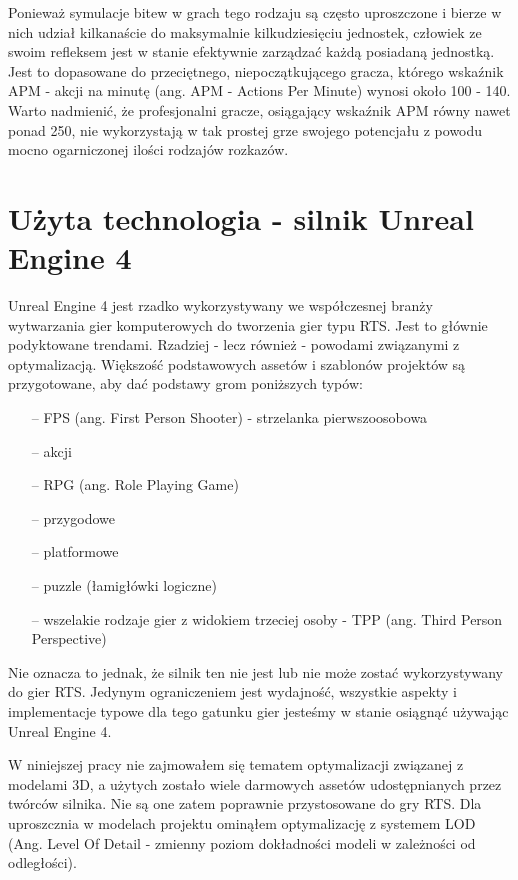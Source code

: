 \documentclass[12pt]{report}
\begin{document}
Ponieważ symulacje bitew w grach tego rodzaju są często uproszczone i bierze w nich udział kilkanaście do maksymalnie kilkudziesięciu jednostek, człowiek ze swoim refleksem jest w stanie efektywnie zarządzać każdą posiadaną jednostką. Jest to dopasowane do przeciętnego, niepoczątkującego gracza, którego wskaźnik APM - akcji na minutę (ang. APM - Actions Per Minute) wynosi około 100 - 140. Warto nadmienić, że profesjonalni gracze, osiągający wskaźnik APM równy nawet ponad 250, nie wykorzystają w tak prostej grze swojego potencjału z powodu mocno ogarniczonej ilości rodzajów rozkazów.




\chapter{Użyta technologia - silnik Unreal Engine 4}

Unreal Engine 4 jest rzadko wykorzystywany we współczesnej branży wytwarzania gier komputerowych do tworzenia gier typu RTS. Jest to głównie podyktowane trendami. Rzadziej - lecz również - powodami związanymi z optymalizacją. Większość podstawowych assetów i szablonów projektów są przygotowane, aby dać podstawy grom poniższych typów:
\begin{itemize}
\item[--] FPS (ang. First Person Shooter) - strzelanka pierwszoosobowa
\item[--] akcji
\item[--] RPG (ang. Role Playing Game)
\item[--] przygodowe
\item[--] platformowe
\item[--] puzzle (łamigłówki logiczne)
\item[--] wszelakie rodzaje gier z widokiem trzeciej osoby - TPP (ang. Third Person Perspective)  
\end{itemize}

Nie oznacza to jednak, że silnik ten nie jest lub nie może zostać wykorzystywany do gier RTS. Jedynym ograniczeniem jest wydajność, wszystkie aspekty i implementacje typowe dla tego gatunku gier jesteśmy w stanie osiągnąć używając Unreal Engine 4. 

W niniejszej pracy nie zajmowałem się tematem optymalizacji związanej z modelami 3D, a użytych zostało wiele darmowych assetów udostępnianych przez twórców silnika. Nie są one zatem poprawnie przystosowane do gry RTS. Dla uproszcznia w modelach projektu ominąłem optymalizację z systemem LOD (Ang. Level Of Detail - zmienny poziom dokładności modeli w zależności od odległości). 
\end{document}
